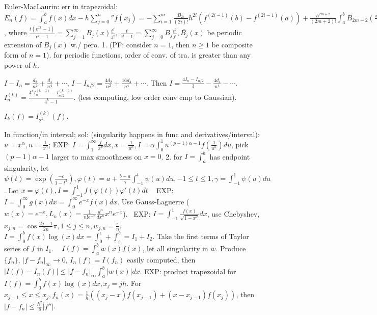  Euler-MacLaurin: err in trapezoidal: $E_n(f) = \int_a^bf(x)dx - h\sum_{j=0}^{n}''f(x_j)  = -\sum_{i=1}^{m}\frac{B_{2i}}{(2i)!}h^{2i}(f^{(2i-1)}(b) - f^{(2i-1)}(a)) + \frac{h^{2m+2}}{(2m+2)!}\int_a^b \bar{B}_{2m+2}(\frac{x-a}{h})f^{(2m+2)}(x)dx $, where $\frac{t(e^{xt}-1)}{e^t-1} = \sum_{j=1}^{\infty}B_j(x)\frac{t^{j}}{j!}, ~\frac{t}{e^t-1} = \sum_{j=0}^{\infty}B_j\frac{t^j}{j!}, \bar{B_j}(x)$ be periodic extension of $B_j(x) $ w./ pero. 1. (PF: consider $n=1$, then $n \ge 1$ be composite form of $n=1$).  for periodic functions, order of conv. of tra. is greater than any power of $h$.

 $I - I_n = \frac{d_2}{n^2}+\frac{d_4}{n^4}+\cdots $, $I-I_{n/2} = \frac{4d_2}{n^2}+\frac{16d_4}{n^4}+\cdots $. Then $I = \frac{4I_n-I_{n/2}}{3} - \frac{4d_4}{n^4}-\cdots$. $I_n^{(k)} = \frac{4^kI_n^{(k-1)}-I_{n/2}^{(k-1)}}{4^k-1} $. (less computing, low order conv cmp to Gaussian).

 $I_k(f) = I_{2^k}^{(k)}(f) $.

 In function/in interval; sol: (singularity happens in func and derivatives/interval): $u = x^\alpha ,u = \frac{1}{x^\alpha}$; EXP: $I = \int_{1}^\infty\frac{f}{x^p}dx, x = \frac{1}{u^\alpha}, I = \alpha\int_0^1u^{(p-1)\alpha-1}f(\frac{1}{u^\alpha})du $, pick $(p-1)\alpha-1$ larger to max smoothness on $x = 0$. 2. for $I = \int_{a}^{b}$ has endpoint singularity, let $\psi(t) = \exp(\frac{-c}{1-t^2}), \varphi(t) = a + \frac{b-a}{\gamma}\int_{-1}^t\psi(u)du, -1\le t\le 1, \gamma  = \int_{-1}^1\psi(u)du $. Let $x = \varphi(t), I = \int_{-1}^1f(\varphi(t))\varphi'(t)dt $ ~ EXP: $I = \int_{0}^{\infty}g(x)dx = \int_{0}^{\infty}e^{-x}f(x)dx $. Use Gauss-Laguerre ($w(x) = e^{-x}, L_n(x) = \frac{1}{n!e^{-x}}\frac{d^n}{dx^n}{x^ne^{-x}} $). ~EXP: $I = \int_{-1}^1\frac{f(x)}{\sqrt{1-x^2}}dx$, use Chebyshev, $x_{j, n} = \cos\frac{2j-1}{2n}\pi, 1\le j\le n, w_{j, n} = \frac{\pi}{n} $. ~ $I = \int_{0}^{b}f(x)\log(x)dx = \int_0^\epsilon+\int_\epsilon^b  = I_1+I_2 $. Take the first terms of Taylor series of $f$ in $I_1 $. ~ $I(f) = \int_a^bw(x)f(x) $, let all singularity in $w$. Produce $\{f_n\}$, $|f-f_n|_{\infty}\to 0 $, $I_n(f) = I(f_n)  $ easily computed, then $|I(f)-I_n(f) |\le |f-f_n|_\infty \int_a^b|w(x)|dx $. EXP: product trapezoidal for $I(f) = \int_0^bf(x)\log(x)dx, x_j = jh$. For $x_{j-1}\le x\le x_j, f_n(x) = \frac{1}{h}((x_j-x)f(x_{j-1})+(x-x_{j-1})f(x_j)) $, then $|f-f_n|\le \frac{h^2}{8}|f''|$.

